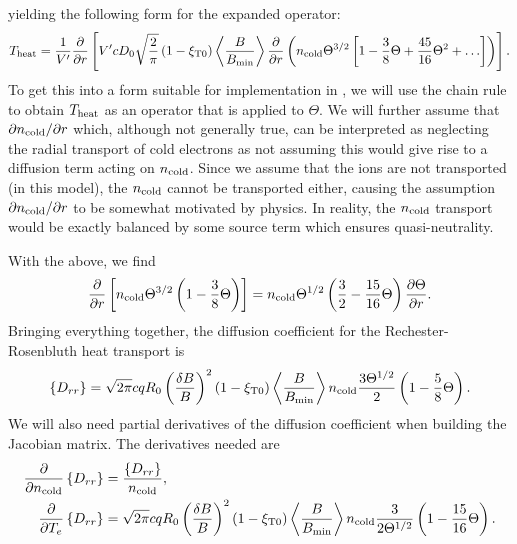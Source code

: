 \documentclass{notes}
\newcommand{\ncold}{n_{\rm cold}}
\newcommand{\Te}{T_e}
\newcommand{\VpVol}{V'}
\begin{document}
    yielding the following form for the expanded operator:
    \begin{equation}
        T_{\rm heat} = \frac{1}{\VpVol}\frac{\partial}{\partial r}\left[
            \VpVol cD_0\sqrt{\frac{2}{\pi}}\left(1-\xi_{\rm T0}\right)\left\langle\frac{B}{B_{\rm min}} \right\rangle
            \frac{\partial}{\partial r}\left( 
                \ncold \Theta^{3/2}\left[ 1 - \frac{3}{8}\Theta + \frac{45}{16}\Theta^2 + \ldots \right]
            \right)
        \right].
    \end{equation}
    To get this into a form suitable for implementation in \DREAM, we will use
    the chain rule to obtain $T_{\rm heat}$ as an operator that is applied to
    $\Theta$. We will further assume that $\partial\ncold/\partial r$ which,
    although not generally true, can be interpreted as neglecting the radial
    transport of cold electrons as not assuming this would give rise to a
    diffusion term acting on $\ncold$. Since we assume that the ions are not
    transported (in this model), the $\ncold$ cannot be transported either,
    causing the assumption $\partial\ncold/\partial r$ to be somewhat motivated
    by physics. In reality, the $\ncold$ transport would be exactly balanced by
    some source term which ensures quasi-neutrality.

    With the above, we find
    \begin{equation}
        \frac{\partial}{\partial r}\left[ \ncold\Theta^{3/2} \left(
            1 - \frac{3}{8}\Theta
        \right)\right] =
        \ncold\Theta^{1/2}\left( \frac{3}{2} - \frac{15}{16}\Theta \right)
        \frac{\partial\Theta}{\partial r}.
    \end{equation}
    Bringing everything together, the diffusion coefficient for the
    Rechester-Rosenbluth heat transport is
    \begin{equation}
        \left\{ D_{rr} \right\} =
        \sqrt{2\pi}cqR_0\left(\frac{\delta B}{B}\right)^2\left(1-\xi_{\rm T0}\right)
        \left\langle\frac{B}{B_{\rm min}}\right\rangle\ncold
        \frac{3\Theta^{1/2}}{2}\left( 1 - \frac{5}{8}\Theta \right).
    \end{equation}
    We will also need partial derivatives of the diffusion coefficient when
    building the Jacobian matrix. The derivatives needed are
    \begin{equation}
        \begin{aligned}
            \frac{\partial}{\partial\ncold}\left\{ D_{rr} \right\} &= \frac{\left\{ D_{rr} \right\}}{\ncold},\\
            \frac{\partial}{\partial\Te}\left\{ D_{rr} \right\} &=
                \sqrt{2\pi}cqR_0\left(\frac{\delta B}{B}\right)^2\left(1-\xi_{\rm T0}\right)
                \left\langle\frac{B}{B_{\rm min}}\right\rangle\ncold
                \frac{3}{2\Theta^{1/2}}\left( 1 - \frac{15}{16}\Theta \right).
        \end{aligned}
    \end{equation}
\end{document}
